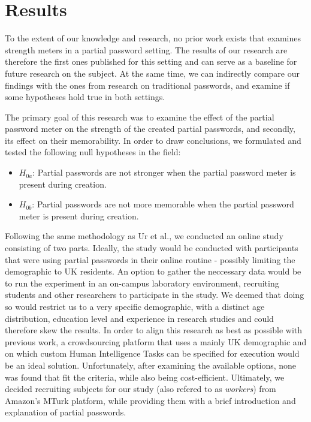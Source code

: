 
\chapter{Results}
\label{cha:results}
To the extent of our knowledge and research, no prior work exists that examines strength meters in a partial password setting. The results of our research are therefore the first ones published for this setting and can serve as a baseline for future research on the subject. At the same time, we can indirectly compare our findings with the ones from research on traditional passwords, and examine if some hypotheses hold true in both settings.

The primary goal of this research was to examine the effect of the partial password meter on the strength of the created partial passwords, and secondly, its effect on their memorability. In order to draw conclusions, we formulated and tested the following null hypotheses in the field:

\begin{itemize}
  \item[] $H_{0a}$: Partial passwords are not stronger when the partial password meter is present during creation.
  \item[] $H_{0b}$: Partial passwords are not more memorable when the partial password meter is present during creation.
\end{itemize}

Following the same methodology as Ur et al., we conducted an online study consisting of two parts. Ideally, the study would be conducted with participants that were using partial passwords in their online routine - possibly limiting the demographic to UK residents. An option to gather the neccessary data would be to run the experiment in an on-campus laboratory environment, recruiting students and other researchers to participate in the study. We deemed that doing so would restrict us to a very specific demographic, with a distinct age distribution, education level and experience in research studies and could therefore skew the results. In order to align this research as best as possible with previous work, a crowdsourcing platform that uses a mainly UK demographic and on which custom Human Intelligence Tasks can be specified for execution would be an ideal solution. Unfortunately, after examining the available options, none was found that fit the criteria, while also being cost-efficient. Ultimately, we decided recruiting subjects for our study (also refered to as \emph{workers}) from Amazon's MTurk platform, while providing them with a brief introduction and explanation of partial passwords.

